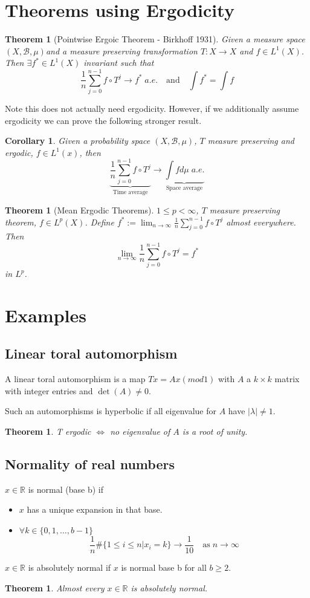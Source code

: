 \documentclass[11pt]{article}
\newcommand{\defeq}{:=}
\newcommand{\msrspc}{\ensuremath{(X,\mathcal{B},\mu)}}
\newcommand{\R}{\mathbb{R}}
\newenvironment{defin}
	{\begin{mdframed}[backgroundcolor=white, roundcorner=5pt, linewidth=1pt]}
	{\end{mdframed}}
\newcommand{\mdf}[1]{{\color{red} #1}}
\newtheorem{theorem}[prop]{Theorem}
\newtheorem{cor}[prop]{Corollary}
\begin{document}
\section{Theorems using Ergodicity}
\begin{theorem}[Pointwise Ergoic Theorem - Birkhoff 1931]
	Given a measure space \msrspc and a measure preserving transformation $T:X \to X$ and $f\in L^1(X)$. Then $\exists f^*\in L^1(X)$ invariant such that
	$$\frac{1}{n}\sum_{j=0}^{n-1}f\circ T^j \to f^* \; a.e.\quad \text{and} \quad \int f^* = \int f$$
\end{theorem}
Note this does not actually need ergodicity. However, if we additionally assume ergodicity we can prove the following stronger result.
\begin{cor}
Given a probability space \msrspc, $T$ measure preserving and ergodic, $f\in L^1(x)$, then
$$\underbrace{\frac{1}{n}\sum_{j=0}^{n-1}f\circ T^j }_{\text{Time average}}\to \underbrace{\int f d\mu \; a.e.}_{\text{Space average}}$$
\end{cor}
\begin{theorem}[Mean Ergodic Theorems]
	$1\leq p < \infty$, $T$ measure preserving theorem, $f\in L^p(X)$. Define $f^*\defeq \lim_{n\to\infty} \frac{1}{n}\sum_{j=0}^{n-1}f\circ T^j$ almost everywhere. Then
	$$\lim_{n\to\infty}\frac{1}{n}\sum_{j=0}^{n-1}f\circ T^j = f^*$$
	in $L^p$.
\end{theorem}
\section{Examples}
\subsection{Linear toral automorphism}
\begin{defin}
A \mdf{linear toral automorphism} is a map $Tx=Ax (mod 1)$ with $A$ a $k\times k$ matrix with integer entries and $\det(A)\neq 0$.

Such an automorphisms is \mdf{hyperbolic} if all eigenvalue for $A$ have $|\lambda|\neq 1$.
\end{defin}
\begin{theorem}
T ergodic $\iff$ no eigenvalue of $A$ is a root of unity.
\end{theorem}
\subsection{Normality of real numbers}
\begin{defin}
$x\in\R$ is \mdf{normal (base b)} if
\begin{itemize}
	\item $x$ has a  unique expansion in that base.
	\item $\forall k\in\{0,1,\dots,b-1\}$
		$$\frac{1}{n}\#\{1\leq i\leq n | x_i=k\}\to\frac{1}{10}\quad\text{as}\;n\to\infty$$
\end{itemize}

$x\in\R$ is \mdf{absolutely normal} if $x$ is normal base b for all $b\geq 2$.
\end{defin}
\begin{theorem}
Almost every $x\in\R$ is absolutely normal.
\end{theorem}
\end{document}
